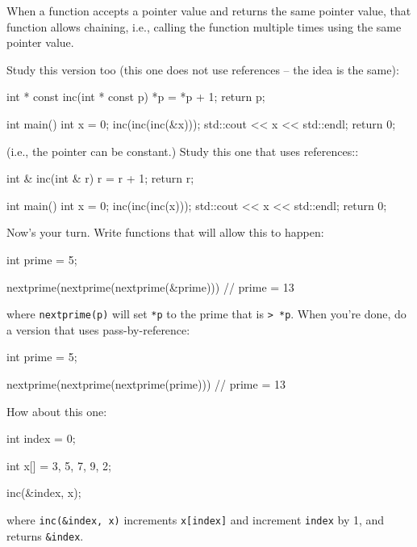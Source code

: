 When a function accepts a pointer value and returns the same pointer value, that function allows chaining, i.e., calling the function multiple times using the same pointer value.

Study this version too (this one does not use references -- the idea is the same):

\begin{consolethree}[escapeinside=||]

int * const inc(int * const p)
{
    *p = *p + 1;
    return p;
}

int main()
{
    int x = 0;
    inc(inc(inc(&x)));
    std::cout << x << std::endl;
    return 0;
}
\end{consolethree}
(i.e., the pointer can be constant.) Study this one that uses references::

\begin{consolethree}[escapeinside=||]
int & inc(int & r)
{
    r = r + 1;
    return r;
}

int main()
{
    int x = 0;
    inc(inc(inc(x)));
    std::cout << x << std::endl;
    return 0;
}
\end{consolethree}

\begin{ex}
Now's your turn. Write functions that will allow this to happen:

\begin{consolethree}[escapeinside=||]

int prime = 5;

nextprime(nextprime(nextprime(&prime))) // prime = 13
\end{consolethree}
where \texttt{nextprime(p)} will set \texttt{*p} to the prime that is \texttt{> *p}. When you're done, do a version that uses pass-by-reference:

\begin{consolethree}[escapeinside=||]
int prime = 5;

nextprime(nextprime(nextprime(prime))) // prime = 13
\end{consolethree}
\end{ex}

\begin{ex}
How about this one:

\begin{consolethree}[escapeinside=||]
int index = 0;

int x[] = {3, 5, 7, 9, 2};

inc(&index, x); 
\end{consolethree}
where \texttt{inc(\&index, x)} increments \texttt{x[index]} and increment \texttt{index} by 1, and returns \texttt{\&index}.
\end{ex}


